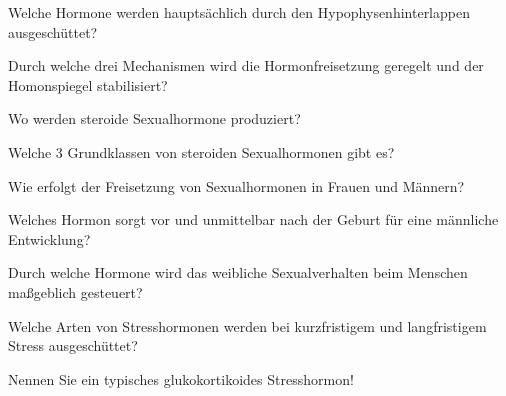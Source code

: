 \documentclass[10pt, a4paper]{exam}
\begin{document}
\begin{questions}
\begin{solution}
  \end{solution}

  \question Welche Hormone werden hauptsächlich durch den Hypophysenhinterlappen ausgeschüttet?
  \begin{solution}

  \end{solution}

  \question Durch welche drei Mechanismen wird die Hormonfreisetzung geregelt und der Homonspiegel stabilisiert?
  \begin{solution}

  \end{solution}

  \question Wo werden steroide Sexualhormone produziert?
  \begin{solution}

  \end{solution}

  \question Welche 3 Grundklassen von steroiden Sexualhormonen gibt es?
  \begin{solution}

  \end{solution}

  \question Wie erfolgt der Freisetzung von Sexualhormonen in Frauen und Männern?
  \begin{solution}

  \end{solution}

  \question Welches Hormon sorgt vor und unmittelbar nach der Geburt für eine männliche Entwicklung?
  \begin{solution}

  \end{solution}

  \question Durch welche Hormone wird das weibliche Sexualverhalten beim Menschen maßgeblich gesteuert?
  \begin{solution}

  \end{solution}

  \question Welche Arten von Stresshormonen werden bei kurzfristigem und langfristigem Stress ausgeschüttet?
  \begin{solution}

  \end{solution}

  \question Nennen Sie ein typisches glukokortikoides Stresshormon!
  \begin{solution}

  \end{solution}


\end{questions}
\end{document}
